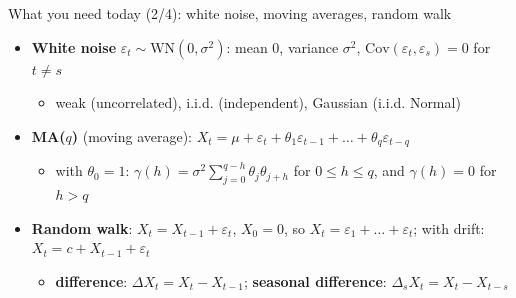 \begin{frame}{What you need today (2/4): white noise, moving averages, random walk}
\itemsize{\small}
\begin{itemize}
    \item \textbf{White noise} $\varepsilon_t \sim \mathrm{WN}(0, \sigma^2)$: mean 0, variance $\sigma^2$, $\mathrm{Cov}(\varepsilon_t, \varepsilon_s) = 0$ for $t \ne s$
    \begin{itemize}
        \item weak (uncorrelated), i.i.d. (independent), Gaussian (i.i.d. Normal)
    \end{itemize}
    \item \textbf{MA($q$)} (moving average): $X_t = \mu + \varepsilon_t + \theta_1\varepsilon_{t-1} + \dots + \theta_q\varepsilon_{t-q}$
    \begin{itemize}
        \item with $\theta_0 = 1$: $\gamma(h) = \sigma^2\sum_{j=0}^{q-h}\theta_j\theta_{j+h}$ for $0 \le h \le q$, and $\gamma(h) = 0$ for $h > q$
    \end{itemize}
    \item \textbf{Random walk}: $X_t = X_{t-1} + \varepsilon_t$, $X_0 = 0$, so $X_t = \varepsilon_1 + \dots + \varepsilon_t$; with drift: $X_t = c + X_{t-1} + \varepsilon_t$
    \begin{itemize}
        \item \textbf{difference}: $\Delta X_t = X_t - X_{t-1}$; \textbf{seasonal difference}: $\Delta_sX_t = X_t - X_{t-s}$
    \end{itemize}
\end{itemize}
\end{frame}

